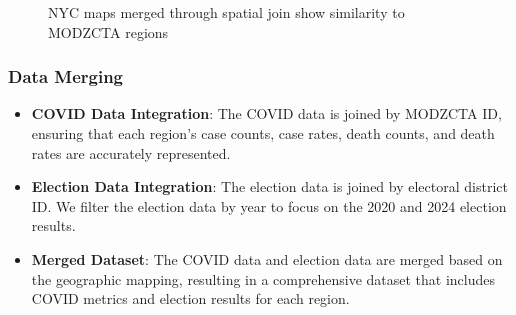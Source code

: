 \documentclass[10pt,journal,compsoc]{IEEEtran}
\begin{document}
\begin{figure}
    \centering
    \caption{NYC maps merged through spatial join show similarity to MODZCTA regions}
    \label{eda-map}
\end{figure}

\subsubsection{Data Merging}
\begin{itemize}
    \item \textbf{COVID Data Integration}: The COVID data is joined by MODZCTA ID, ensuring that each region's case counts, case rates, death counts, and death rates are accurately represented.
    \item \textbf{Election Data Integration}: The election data is joined by electoral district ID. We filter the election data by year to focus on the 2020 and 2024 election results.
    \item \textbf{Merged Dataset}: The COVID data and election data are merged based on the geographic mapping, resulting in a comprehensive dataset that includes COVID metrics and election results for each region.
\end{itemize}
\end{document}
